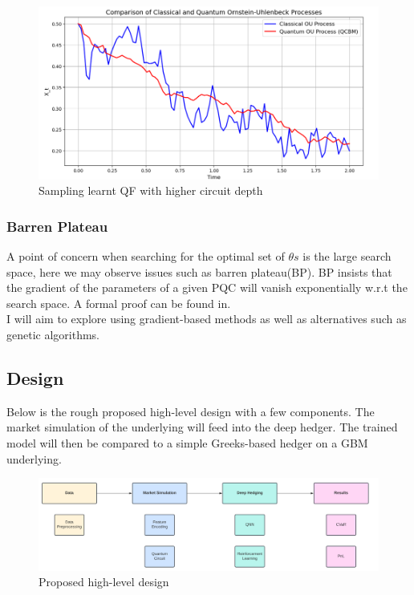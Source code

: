 \documentclass[12pt]{article}
\numberwithin{equation}{section}
\begin{document}
\begin{figure}[h]
    \centering
    \includegraphics[scale=0.7]{Quantile2.png}
    \caption{Sampling learnt QF with higher circuit depth}
\end{figure}

\clearpage
\subsubsection{Barren Plateau}
A point of concern when searching for the optimal set of $\theta s$ is the large search space, here we may observe issues such as barren plateau(BP). BP 
insists that the gradient of the parameters of a given PQC will vanish exponentially 
w.r.t the search space. A formal proof can be found in\autocite{ragone_2024_a}. 
\\ 
I will aim to explore using gradient-based methods as well as alternatives such 
as genetic algorithms. 
\subsection{Design}
Below is the rough proposed high-level design with a few components. The market 
simulation of the underlying will feed into the deep hedger. The trained model 
will then be compared to a simple Greeks-based hedger on a GBM underlying.
\begin{figure}[h!]
    \centering
    \includegraphics[width=\textwidth]{pipeline.png}
    \caption{Proposed high-level design}
\end{figure}
\end{document}
